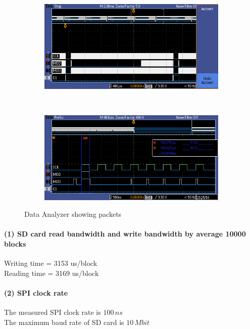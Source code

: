 \documentclass[a4paper]{article}
\newlength{\pic}
\begin{document}
\setlength{\pic}{8cm}
\begin{figure}[htp]
\center
\begin{subfigure}[H]{\pic}
\includegraphics[width=\pic]{scope/packet}
\end{subfigure}
\\[5pt]
\begin{subfigure}[H]{\pic}
\includegraphics[width=\pic]{scope/packet_zoom}
\end{subfigure}
\caption{Data Analyzer showing packets}
\end{figure}

\paragraph{(1) SD card read bandwidth and write bandwidth by average 10000 blocks\\ }
Writing time = 3153 us/block\\
Reading time = 3169 us/block

\paragraph{(2) SPI clock rate}
The measured SPI clock rate is $100\,ns$\\
The maximum baud rate of SD card is $10\,Mbit$\\
\end{document}
